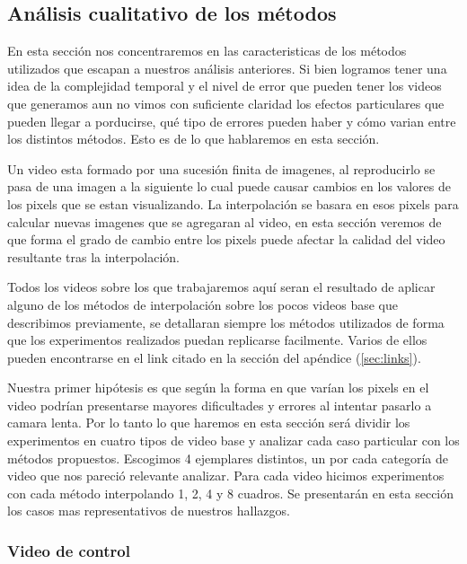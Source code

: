 \subsection{Análisis cualitativo de los métodos}

En esta sección nos concentraremos en las caracteristicas de los métodos utilizados que escapan a nuestros análisis anteriores. Si bien logramos tener una idea de la complejidad temporal y el nivel de error que pueden tener los videos que generamos aun no vimos con suficiente claridad los efectos particulares que pueden llegar a porducirse, qué tipo de errores pueden haber y cómo varian entre los distintos métodos. Esto es de lo que hablaremos en esta sección.

Un video esta formado por una sucesión finita de imagenes, al reproducirlo se pasa de una imagen a la siguiente lo cual puede causar cambios en los valores de los pixels que se estan visualizando. La interpolación se basara en esos pixels para calcular nuevas imagenes que se agregaran al video, en esta sección veremos de que forma el grado de cambio entre los pixels puede afectar la calidad del video resultante tras la interpolación.

Todos los videos sobre los que trabajaremos aquí seran el resultado de aplicar alguno de los métodos de interpolación sobre los pocos videos base que describimos previamente, se detallaran siempre los métodos utilizados de forma que los experimentos realizados puedan replicarse facilmente. Varios de ellos pueden encontrarse en el link citado en la sección del apéndice (\ref{sec:links}).

Nuestra primer hipótesis es que según la forma en que varían los pixels en el video podrían presentarse mayores dificultades y errores al intentar pasarlo a camara lenta. Por lo tanto lo que haremos en esta sección será dividir los experimentos en cuatro tipos de video base y analizar cada caso particular con los métodos propuestos. Escogimos 4 ejemplares distintos, un por cada categoría de video que nos pareció relevante analizar. Para cada video hicimos experimentos con cada método interpolando 1, 2, 4 y 8 cuadros. Se presentarán en esta sección los casos mas representativos de nuestros hallazgos.

\subsubsection{Video de control}

